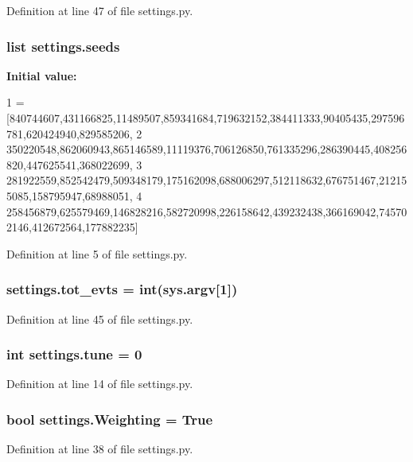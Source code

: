 Definition at line 47 of file settings.\+py.

\subsubsection[{\texorpdfstring{seeds}{seeds}}]{\setlength{\rightskip}{0pt plus 5cm}list settings.\+seeds}\hypertarget{namespacesettings_a8b4db2e0ad1b494a7e46577356f7a1b2}{}\label{namespacesettings_a8b4db2e0ad1b494a7e46577356f7a1b2}
{\bfseries Initial value\+:}
\begin{DoxyCode}
1 = [840744607,431166825,11489507,859341684,719632152,384411333,90405435,297596781,620424940,829585206,
2        350220548,862060943,865146589,11119376,706126850,761335296,286390445,408256820,447625541,368022699,
3        281922559,852542479,509348179,175162098,688006297,512118632,676751467,212155085,158795947,68988051,
4        258456879,625579469,146828216,582720998,226158642,439232438,366169042,745702146,412672564,177882235]
\end{DoxyCode}


Definition at line 5 of file settings.\+py.

\subsubsection[{\texorpdfstring{tot\+\_\+evts}{tot_evts}}]{\setlength{\rightskip}{0pt plus 5cm}settings.\+tot\+\_\+evts = int(sys.\+argv\mbox{[}1\mbox{]})}\hypertarget{namespacesettings_a05f6f4b8d16087cff8c66baecd6b9526}{}\label{namespacesettings_a05f6f4b8d16087cff8c66baecd6b9526}


Definition at line 45 of file settings.\+py.

\subsubsection[{\texorpdfstring{tune}{tune}}]{\setlength{\rightskip}{0pt plus 5cm}int settings.\+tune = 0}\hypertarget{namespacesettings_a3a71b954dc507b7c139f5a59def558ac}{}\label{namespacesettings_a3a71b954dc507b7c139f5a59def558ac}


Definition at line 14 of file settings.\+py.

\subsubsection[{\texorpdfstring{Weighting}{Weighting}}]{\setlength{\rightskip}{0pt plus 5cm}bool settings.\+Weighting = True}\hypertarget{namespacesettings_a73303983a691070f10b880f7a5960a39}{}\label{namespacesettings_a73303983a691070f10b880f7a5960a39}


Definition at line 38 of file settings.\+py.

